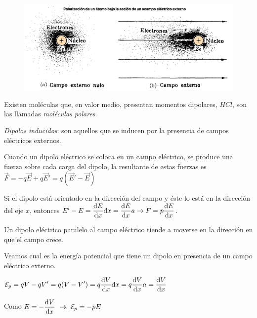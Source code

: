\begin{figure}[H]
	\centering
	\includegraphics[width=1\textwidth]{imagenes/imagenes24/T24IM05.png}
\end{figure}

Existen moléculas que, en valor medio, presentan momentos dipolares, $HCl$, son las llamadas \emph{moléculas polares}.

\emph{Dipolos inducidos}: son aquellos que se inducen por la presencia de campos eléctricos externos.

Cuando un dipolo eléctrico se coloca en un campo eléctrico, se produce una fuerza sobre cada carga del dipolo, la resultante de estas fuerzas es $\vec F=-q\vec E + q \vec E'=q(\vec E'-\vec E)$

Si el dipolo está orientado en la dirección del campo y éste lo está en la dirección del eje $x$, entonces $E'-E=\displaystyle \dv{E}{x} \dd x=\dv{E}{x} a \to F=p\dv{E}{x}$.

Un dipolo eléctrico paralelo al campo eléctrico tiende a moverse en la dirección en que el campo crece.

Veamos cual es la energía potencial que tiene un dipolo en presencia de un campo eléctrico externo.

$\displaystyle \mathcal E_p=qV-qV'=q(V-V')=q\dv{V}{x}\dd x=q\dv{V}{x} a=\dv{V}{x}$

Como $E=\displaystyle -\dv{V}{x} \ \to \ \mathcal E_p=-pE$

